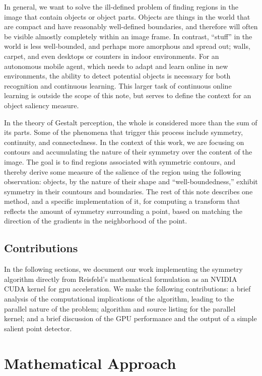 In general, we want to solve the ill-defined problem of finding regions in the image that contain objects or object parts. Objects are things in the world that are compact and have reasonably well-defined boundaries, and therefore will often be visible almostly completely within an image frame. In contrast, ``stuff'' in the world is less well-bounded, and perhaps more amorphous and spread out; \eg walls, carpet, and even desktops or counters in indoor environments. For an autonomous mobile agent, which needs to adapt and learn online in new environments, the ability to detect potential objects is necessary for both recognition and continuous learning. This larger task of continuous online learning is outside the scope of this note, but serves to define the context for an object saliency measure.

In the theory of Gestalt perception, the whole is considered more than the sum of its parts\cite{jakel_overview_2016}. Some of the phenomena that trigger this process include symmetry, continuity, and connectedness. In the context of this work, we are focusing on contours and accumulating the nature of their symmetry over the content of the image. The goal is to find regions associated with symmetric contours, and thereby derive some measure of the salience of the region using the following observation: objects, by the nature of their shape and ``well-boundedness,'' exhibit symmetry in their countours and boundaries. The rest of this note describes one method, and a specific implementation of it, for computing a transform that reflects the amount of symmetry surrounding a point, based on matching the direction of the gradients in the neighborhood of the point. 

\subsection{Contributions}
\label{sec:contributions}

In the following sections, we document our work implementing the symmetry algorithm directly from Reisfeld's mathematical formulation as an NVIDIA CUDA kernel for \gls{gpu} acceleration. We make the following contributions: a brief analysis of the computational implications of the algorithm, leading to the parallel nature of the problem; algorithm and source listing for the parallel kernel; and a brief discussion of the GPU performance and the output of a simple salient point detector. 

\section{Mathematical Approach}
\label{sec:mathematical}

